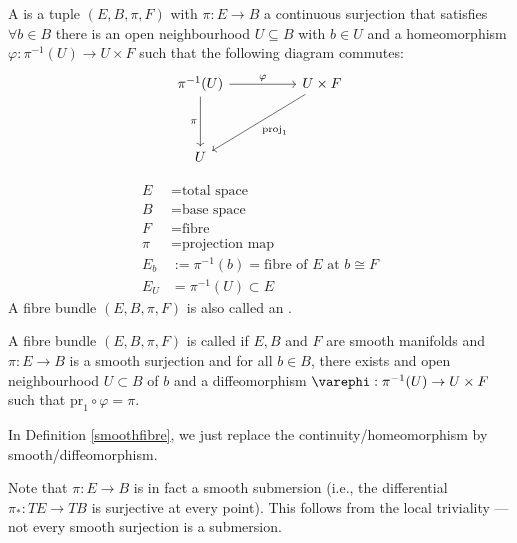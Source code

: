 \documentclass[main.tex]{subfiles}
\begin{document}
 A  is a tuple $(E, B, \pi, F)$ with $\pi: E \to B$ a continuous surjection that satisfies
$\forall b \in B$ there is an open neighbourhood $U \subseteq B$ with $b \in U$ and a homeomorphism $\varphi: \pi^{-1}(U) \to U \times F$ such that the following diagram commutes:
\[
\begin{tikzcd}
 \pi^{-1}(U) \arrow[dd, "\pi"'] \arrow[rr, "\varphi"] &  & U \times F \arrow[lldd, "\text{proj}_1"] \\
                                                      &  &                                          \\
U                                                     &  &
\end{tikzcd}
\]

\begin{notation}
\begin{align*}
    E &= \text{total space} \\
    B &= \text{base space} \\
    F &= \text{fibre} \\
    \pi &= \text{projection map} \\
    E_b &:= \pi^{-1}(b) = \text{fibre of $E$ at $b$} \cong F \\
    E_U &= \pi^{-1}(U) \subset E
\end{align*}
A fibre bundle $(E, B, \pi, F)$ is also called an .
\end{notation}

\begin{defn}\label{smoothfibre}
A fibre bundle $(E, B, \pi, F)$ is called  if $E, B$ and $F$ are smooth manifolds and $\pi : E \to B$ is a smooth surjection and for all $b \in B$, there exists and open neighbourhood $U \subset B$ of $b$ and a diffeomorphism $\varephi: \pi^{-1}(U) \to U \times F$ such that $\text{pr}_1 \circ \varphi = \pi$.
\end{defn}

\begin{note}
In Definition \ref{smoothfibre}, we just replace the continuity/homeomorphism by smooth/diffeomorphism.
\end{note}

\begin{rmk}
Note that $\pi: E \to B$ is in fact a smooth submersion (i.e., the differential $\pi_* : TE \to TB$ is surjective at every point). This follows from the local triviality --- not every smooth surjection is a submersion.
\end{rmk}
\end{document}
